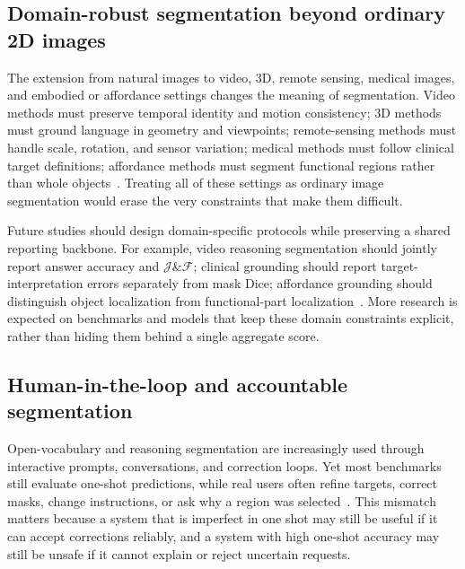 \subsection{Domain-robust segmentation beyond ordinary 2D images}

The extension from natural images to video, 3D, remote sensing, medical images, and embodied or affordance settings changes the meaning of segmentation. Video methods must preserve temporal identity and motion consistency; 3D methods must ground language in geometry and viewpoints; remote-sensing methods must handle scale, rotation, and sensor variation; medical methods must follow clinical target definitions; affordance methods must segment functional regions rather than whole objects~\citep{baiOneTokenSeg2024,zhengVillaVideoReasoning2025,chen3DDRESDetailed3D2026,huangSurprise3dDatasetSpatial2026,libExploringEfficientOpenvocabulary2026,yanMedreasonerReinforcementLearning2026,wangAffordancer1ReinforcementLearning2026}. Treating all of these settings as ordinary image segmentation would erase the very constraints that make them difficult.

Future studies should design domain-specific protocols while preserving a shared reporting backbone. For example, video reasoning segmentation should jointly report answer accuracy and $\mathcal{J}\&\mathcal{F}$; clinical grounding should report target-interpretation errors separately from mask Dice; affordance grounding should distinguish object localization from functional-part localization~\citep{zhengVillaVideoReasoning2025,yanMedreasonerReinforcementLearning2026,wangAffordancer1ReinforcementLearning2026}. More research is expected on benchmarks and models that keep these domain constraints explicit, rather than hiding them behind a single aggregate score.

\subsection{Human-in-the-loop and accountable segmentation}

Open-vocabulary and reasoning segmentation are increasingly used through interactive prompts, conversations, and correction loops. Yet most benchmarks still evaluate one-shot predictions, while real users often refine targets, correct masks, change instructions, or ask why a region was selected~\citep{kirillov2023sam,ravi2024sam2,rasheedGlammPixelGrounding2024,wuSeeSaySegment2024}. This mismatch matters because a system that is imperfect in one shot may still be useful if it can accept corrections reliably, and a system with high one-shot accuracy may still be unsafe if it cannot explain or reject uncertain requests.


